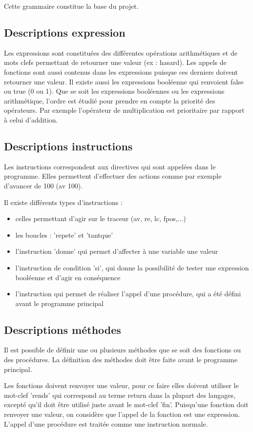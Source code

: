 \documentclass[a4paper,11pt]{article}
\begin{document}
Cette grammaire constitue la base du projet.

\subsection{Descriptions expression}
Les expressions sont constituées des différentes opérations arithmétiques et de mots clefs permettant de retourner une valeur (ex : hasard). Les appels de fonctions sont aussi contenus dans les expressions puisque ces derniers doivent retourner une valeur.
Il existe aussi les expressions booléenne qui renvoient false ou true (0 ou 1).
Que se soit les expressions booléennes ou les expressions arithmétique, l'ordre est étudié pour prendre en compte la priorité des opérateurs. Par exemple l'opérateur de multiplication est prioritaire par rapport à celui d'addition.

\subsection{Descriptions instructions}
Les instructions correspondent aux directives qui sont appelées dans le programme. Elles permettent d'effectuer des actions comme par exemple d'avancer de 100 (av 100).

Il existe différents types d'instructions :
\begin{itemize}
	\item celles permettant d'agir sur le traceur (av, re, lc, fpos,...)
	\item les boucles : 'repete' et 'tantque'
	\item l'instruction 'donne' qui permet d'affecter à une variable une valeur
	\item l'instruction de condition 'si', qui donne la possibilité de tester une expression booléenne et d'agir en conséquence
	\item l'instruction qui permet de réaliser l'appel d'une procédure, qui a été défini avant le programme principal
\end{itemize}

\subsection{Descriptions méthodes}
Il est possible de définir une ou plusieurs méthodes que se soit des fonctions ou des procédures. La définition des méthodes doit être faite avant le programme principal.

Les fonctions doivent renvoyer une valeur, pour ce faire elles doivent utiliser le mot-clef 'rends' qui correspond au terme return dans la plupart des langages, excepté qu'il doit être utilisé juste avant le mot-clef 'fin'.
Puisqu'une fonction doit renvoyer une valeur, on considère que l'appel de la fonction est une expression.
L'appel d'une procédure est traitée comme une instruction normale.
\end{document}
